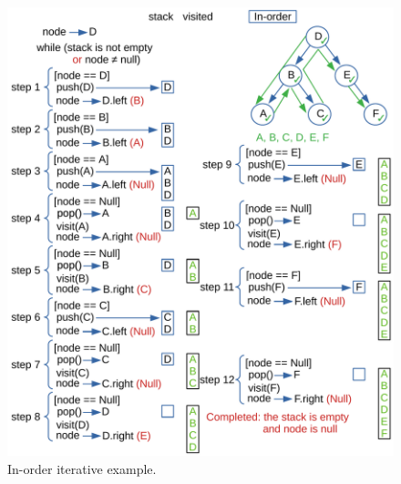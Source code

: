 \begin{figure}[H]
	\begin{center}
		\includegraphics[scale=.6]{chapters/appendix/images/appendixtree/treesappendix_2.pdf}
		\caption[In-order iterative example.]{In-order iterative example.}
		\label{appendixtrees_2}
	\end{center}
\end{figure}

